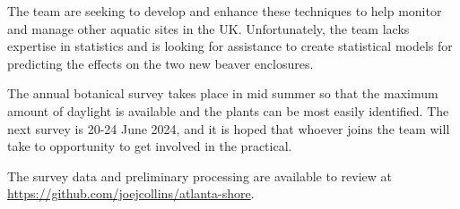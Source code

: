 \documentclass{roles}
\begin{document}
The team are seeking to develop and enhance these techniques
to help monitor and manage other aquatic sites in the UK.
Unfortunately, the team lacks expertise in statistics
and is looking for assistance to create statistical models for predicting the effects
on the two new beaver enclosures.

The annual botanical survey takes place in mid summer
so that the maximum amount of daylight is available
and the plants can be most easily identified.
The next survey is 20-24 June 2024,
and it is hoped that whoever joins the team
will take to opportunity to get involved in the practical.

The survey data and preliminary processing are available
to review at \href{https://github.com/joejcollins/atlanta-shore}{https://github.com/joejcollins/atlanta-shore}.
\end{document}
